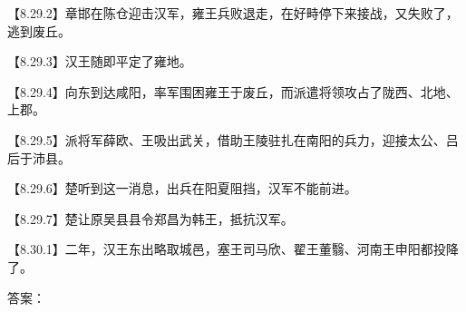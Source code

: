 \documentclass[fontset=none,11pt,a4paper]{ctexart}
\newcommand{\answerline}[1]{\underline{\hspace{#1}}}
\begin{document}
\begin{enumerate}[label=\Alph*.]
\noindent 【8.29.2】章邯在陈仓迎击汉军，雍王兵败退走，在好畤停下来接战，又失败了，逃到废丘。\par
\noindent 【8.29.3】汉王随即平定了雍地。\par
\noindent 【8.29.4】向东到达咸阳，率军围困雍王于废丘，而派遣将领攻占了陇西、北地、上郡。\par
\noindent 【8.29.5】派将军薛欧、王吸出武关，借助王陵驻扎在南阳的兵力，迎接太公、吕后于沛县。\par
\noindent 【8.29.6】楚听到这一消息，出兵在阳夏阻挡，汉军不能前进。\par
\noindent 【8.29.7】楚让原吴县县令郑昌为韩王，抵抗汉军。\par
\noindent 【8.30.1】二年，汉王东出略取城邑，塞王司马欣、翟王董翳、河南王申阳都投降了。\par
\end{enumerate}
答案：\answerline{2.2cm}
\end{document}
